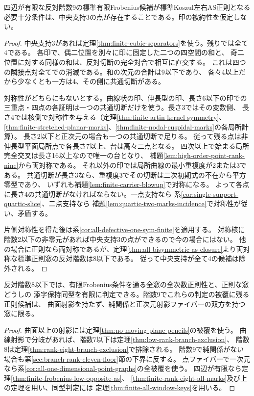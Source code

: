 \begin{theorem}\label{thm:finite-rank-nine-all-marks}
四辺が有限な反対階数9の標準有限Frobenius候補が標準Koszul左右AS正則となる
必要十分条件は、中央支持3の点が存在することである。印の被約性を仮定しない。
\end{theorem}
\begin{proof}
中央支持3があれば定理\ref{thm:finite-cubic-separators}を使う。残りでは全て4である。
各印で、偶二位置を別々に印に固定した二つの四空間の和と、
奇二位置に対する同様の和は、反対切断の完全対合で相互に直交する。
これは四つの隣接点対全てでの消滅である。和の次元の合計は9以下であり、
各々4以上だから少なくとも一方は4、その側に共通切断がある。

対称性がどちらにもないとする。曲線状の印、伸長型の印、長さ6以下の印での
三重点・四点の各証明は一つの共通切断だけを使う。長さ3ではその変数側、
長さ4では核側で対称性を与える（定理\ref{thm:finite-artin-kernel-symmetry}、
\ref{thm:finite-stretched-planar-marks}、\ref{thm:finite-nodal-cuspidal-marks}の各局所計算）。
長さ2以下と正次元の場合も一つの共通切断で足りる。
従って残る点は非伸長型平面局所点で各長さ7以上、台は高々二点となる。
四次以上で始まる局所完全交叉は長さ16以上なので唯一の台となり、
補題\ref{lem:high-order-point-rank-nine}から両対称である。
それ以外の印では局所曲線の最小重複度が2または3である。
共通切断が長さ3なら、重複度3でその切断は二次初期式の不在から平方零型であり、
いずれも補題\ref{lem:finite-carrier-blowup}で対称になる。
よって各点に長さ4の共通切断がなければならない。一点支持なら
系\ref{cor:single-support-quartic-slice}、二点支持なら
補題\ref{lem:quartic-two-marks-incidence}で対称性が従い、矛盾する。

片側対称性を得た後は系\ref{cor:all-defective-one-sym-finite}を適用する。
対称核に階数2以下の非零元があれば中央支持3の点ができるので今の場合にはない。
他の場合に正則なら両対称であるが、定理\ref{thm:all-bisymmetric-as-closure}より両対称な標準正則窓の反対階数は8以下である。
従って中央支持が全て4の候補は除外される。
\end{proof}

\begin{corollary}\label{cor:all-windows-through-eight}
反対階数8以下では、有限Frobenius条件を通る全窓の全次数正則性と、正則な窓どうしの
添字保持同型を有限に判定できる。階数9でこれらの判定の被覆に残る正則候補は、
曲面射影を持たず、純関係と正次元射影ファイバーの双方を持つ窓に限る。
\end{corollary}
\begin{proof}
曲面以上の射影には定理\ref{thm:no-moving-plane-pencils}の被覆を使う。
曲線射影で分岐があれば、階数7以下は定理\ref{thm:low-rank-branch-exclusion}、
階数8は定理\ref{thm:rank-eight-branch-exclusion}で排除される。
階数9で純関係がない場合も第\ref{sec:branch-rank-eleven-floor}節の下界に反する。
点ファイバーで一次元なら系\ref{cor:all-one-dimensional-point-graphs}の全被覆を使う。
四辺が有限なら定理\ref{thm:finite-frobenius-low-opposite-as}、
\ref{thm:finite-rank-eight-all-marks}及び上の定理を用い、同型判定には
定理\ref{thm:finite-all-window-keys}を用いる。
\end{proof}
